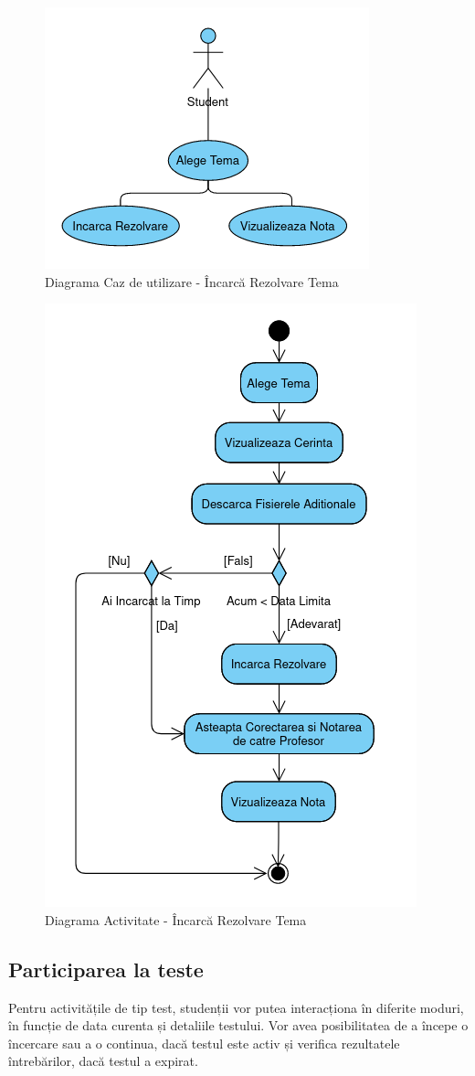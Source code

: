 \documentclass[12pt, a4paper, oneside, romanian]{teza-upb}
\begin{document}
\begin{figure}[H]
\centering
\includegraphics*[width=0.5\columnwidth]{diagrama-use-case-incarca-rezolvare-tema}
\caption{Diagrama Caz de utilizare - Încarcă Rezolvare Tema}
\label{diagrama-use-case-incarca-rezolvare-tema}
\end{figure}


\begin{figure}[H]
\centering
\includegraphics*[width=0.55\columnwidth]{diagrama-activitate-incarca-rezolvare-tema}
\caption{Diagrama Activitate - Încarcă Rezolvare Tema}
\label{diagrama-activitate-incarca-rezolvare-tema}
\end{figure}


\subsection{Participarea la teste}

Pentru activitățile de tip test, studenții vor putea interacționa în diferite moduri, în funcție de data curenta și detaliile testului. Vor avea posibilitatea de a începe o încercare sau a o continua, dacă testul este activ și verifica rezultatele întrebărilor, dacă testul a expirat. 
\end{document}
